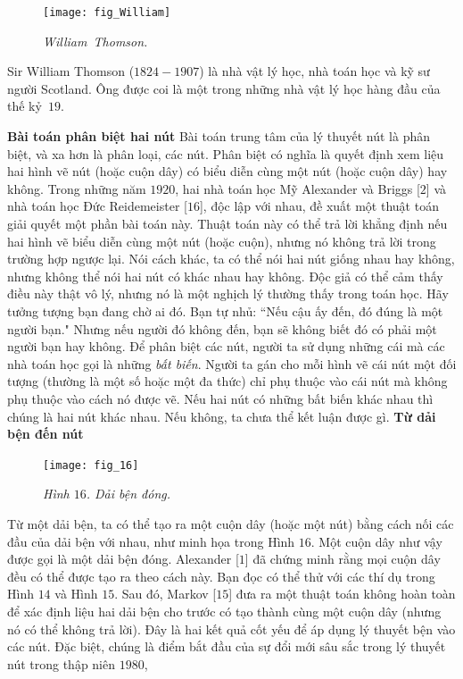 \begin{multicols}{2}
	\begin{tBox}
		\begin{figure}
			\vspace*{-15pt}
			\centering
			\captionsetup{labelformat= empty, justification=centering}
			\texttt{[image: fig\_William]}
			\caption{\small\textit{\color{duongvaotoanhoc}William~Thomson.}}
			\vspace*{-10pt}
		\end{figure}
		Sir William Thomson ($1824-1907$) là nhà vật lý học, nhà toán học và kỹ sư người Scotland. Ông được coi là một trong những nhà vật lý học hàng đầu của thế kỷ~$19$.
	\end{tBox}
	\textbf{\color{duongvaotoanhoc}Bài toán phân biệt hai nút}
	\vskip 0.1cm
	Bài toán trung tâm của lý thuyết nút là phân biệt, và xa hơn là phân loại, các nút. Phân biệt có nghĩa là quyết định xem liệu hai hình vẽ nút (hoặc cuộn dây) có biểu diễn cùng một nút (hoặc cuộn dây) hay không. Trong những năm $1920$, hai nhà toán học Mỹ Alexander và Briggs [$2$] và nhà toán học Đức Reidemeister [$16$], độc lập với nhau, đề xuất một thuật toán giải quyết một phần bài toán này. Thuật toán này có thể trả lời khẳng định nếu hai hình vẽ biểu diễn cùng một nút (hoặc cuộn), nhưng nó không trả lời trong trường hợp ngược lại. Nói cách khác, ta có thể nói hai nút giống nhau hay không, nhưng không thể nói hai nút có khác nhau hay không. Độc giả có thể cảm thấy điều này thật vô lý, nhưng nó là một nghịch lý thường thấy trong toán học. Hãy tưởng tượng bạn đang chờ ai đó. Bạn tự nhủ: ``Nếu cậu ấy đến, đó đúng là một người bạn." Nhưng nếu người đó không đến, bạn sẽ không biết đó có phải một người bạn hay không.
	\vskip 0.05cm
	Để phân biệt các nút, người ta sử dụng những cái mà các nhà toán học gọi là những \textit{bất biến}. Người ta gán cho mỗi hình vẽ cái nút một đối tượng (thường là một số hoặc một đa thức) chỉ phụ thuộc vào cái nút mà không phụ thuộc vào cách nó được vẽ. Nếu hai nút có những bất biến khác nhau thì chúng là hai nút khác nhau. Nếu không, ta chưa thể kết luận được gì.
	\vskip 0.1cm
	\textbf{\color{duongvaotoanhoc}Từ dải bện đến nút}
	\begin{figure}[H]
		\vspace*{-10pt}
		\centering
		\captionsetup{labelformat= empty, justification=centering}
		\texttt{[image: fig\_16]}
		\caption{\small\textit{\color{duongvaotoanhoc}Hình $16$. Dải bện đóng.}}
		\vspace*{-10pt}
	\end{figure}
	Từ một dải bện, ta có thể tạo ra một cuộn dây (hoặc một nút) bằng cách nối các đầu của dải bện với nhau, như minh họa trong Hình $16$. Một cuộn dây như vậy được gọi là một dải bện đóng. Alexander [$1$] đã chứng minh rằng mọi cuộn dây đều có thể được tạo ra theo cách này. Bạn đọc có thể thử với các thí dụ trong Hình $14$ và Hình $15$. Sau đó, Markov [$15$] đưa ra một thuật toán không hoàn toàn để xác định liệu hai dải bện cho trước có tạo thành cùng một cuộn dây (nhưng nó có thể không trả lời). Đây là hai kết quả cốt yếu để áp dụng lý thuyết bện vào các nút. Đặc biệt, chúng là điểm bắt đầu của sự đổi mới sâu sắc trong lý thuyết nút trong thập niên $1980$,

\end{multicols}
